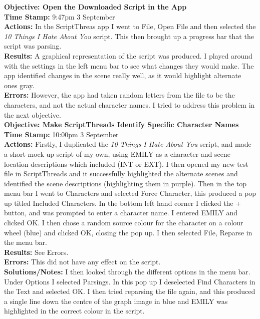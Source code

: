 \documentclass{article}
\begin{document}
\textbf{Objective: Open the Downloaded Script in the App}\\
\textbf{Time Stamp:} 9:47pm 3 September\\
\textbf{Actions:} In the ScriptThreas app I went to File, Open File and then selected the \textit{10 Things I Hate About You} script. This then brought up a progress bar that the script was parsing.\\
\textbf{Results:} A graphical representation of the script was produced. I played around with the settings in the left menu bar to see what changes they would make. The app identified changes in the scene really well, as it would highlight alternate ones gray.\\
\textbf{Errors:} However, the app had taken random letters from the file to be the characters, and not the actual character names. I tried to address this problem in the next objective.\\

\textbf{Objective: Make ScriptThreads Identify Specific Character Names}\\
\textbf{Time Stamp:} 10:00pm 3 September\\
\textbf{Actions:} Firstly, I duplicated the \textit{10 Things I Hate About You} script, and made a short mock up script of my own, using EMILY as a character and scene location descriptions which included (INT or EXT). I then opened my new test file in ScriptThreads and it successfully highlighted the alternate scenes and identified the scene descriptions (highlighting them in purple). Then in the top menu bar I went to Characters and selected Force Character, this produced a pop up titled Included Characters. In the bottom left hand corner I clicked the + button, and was prompted to enter a character name. I entered EMILY and clicked OK. I then chose a random source colour for the character on a colour wheel (blue) and clicked OK, closing the pop up. I then selected File, Reparse in the menu bar.\\
\textbf{Results:} See Errors.\\
\textbf{Errors:} This did not have any effect on the script.\\
\textbf{Solutions/Notes:} I then looked through the different options in the menu bar. Under Options I selected Parsings. In this pop up I deselected Find Characters in the Text and selected OK. I then tried reparsing the file again, and this produced a single line down the centre of the graph image in blue and EMILY was highlighted in the correct colour in the script.\\
\end{document}
